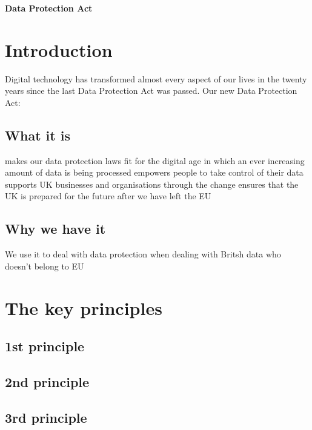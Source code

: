 \documentclass[a4paper,12pt]{article}
\begin{document}
\textbf{Data Protection Act}


\tableofcontents
\clearpage

 
\section{Introduction}

Digital technology has transformed almost every aspect of our lives in the twenty years since the last Data Protection Act was passed.
Our new Data Protection Act:
 
\subsection{What it is}

makes our data protection laws fit for the digital age in which an ever increasing amount of data is being processed
empowers people to take control of their data
supports UK businesses and organisations through the change
ensures that the UK is prepared for the future after we have left the EU

 
\subsection{Why we have it}
 We use it to deal with data protection when dealing with Britsh data who doesn't belong to EU
 
\section{The key principles}
 
\subsection{1st principle}

 
\subsection{2nd principle}

 
\subsection{3rd principle}

\clearpage

\printindex
\end{document}

